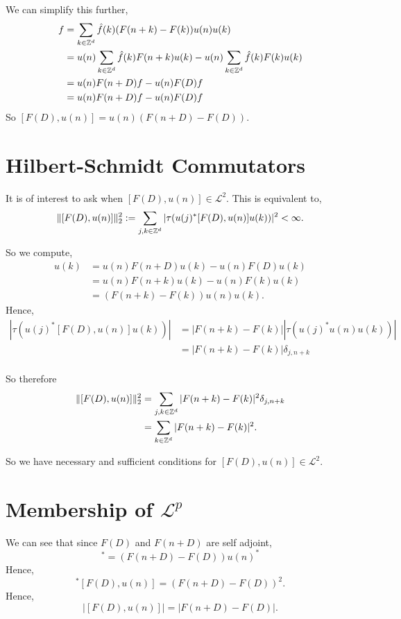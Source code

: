 We can simplify this further,
\begin{align}
    [F(D),u(n)]f &= \sum_{k \in \Itgr^d} \hat{f}(k) (F(n+k)-F(k))u(n)u(k)\\
                 &= u(n)\sum_{k \in \Itgr^d}  \hat{f}(k) F(n+k)u(k) - u(n) \sum_{k \in \Itgr^d} \hat{f}(k)F(k)u(k)\\
                 &= u(n) F(n+D)f - u(n)F(D)f\\
                 \label{commutatorFormula}
                 &= u(n)F(n+D)f - u(n)F(D)f
\end{align}
So $[F(D),u(n)] = u(n)(F(n+D)-F(D))$. 

\section{Hilbert-Schmidt Commutators}
It is of interest to ask when $[F(D),u(n)] \in \mathcal{L}^2$. This is equivalent to,
\begin{equation}
    \|[F(D),u(n)]\|_{2}^2 := \sum_{j,k \in \mathbb{Z}^d} |\tau(u(j)^* [F(D),u(n)]u(k))|^2 < \infty.
\end{equation}

So we compute,
\begin{align}
    [F(D),u(n)]u(k) &= u(n)F(n+D)u(k) - u(n)F(D)u(k)\\
                    &= u(n)F(n+k)u(k) - u(n)F(k)u(k)\\
                    &= (F(n+k)-F(k))u(n)u(k).
\end{align}
Hence,
\begin{align}
    |\tau(u(j)^*[F(D),u(n)]u(k))| &= |F(n+k)-F(k)||\tau(u(j)^*u(n)u(k))|\\
                                  &= |F(n+k)-F(k)|\delta_{j,n+k}\\
\end{align}

So therefore
\begin{align}
\label{HSConditions}
    \|[F(D),u(n)]\|_{2}^2 &= \sum_{j,k \in \Itgr^d} |F(n+k)-F(k)|^2 \delta_{j,n+k}\\
                          &= \sum_{k \in \Itgr^d} |F(n+k)-F(k)|^2.
\end{align}

So we have necessary and sufficient conditions for $[F(D),u(n)] \in \mathcal{L}^2$. 

\section{Membership of $\mathcal{L}^p$}
We can see that since $F(D)$ and $F(n+D)$ are self adjoint, 
\begin{equation}
    [F(D),u(n)]^* = (F(n+D)-F(D))u(n)^*
\end{equation}
Hence,
\begin{equation}
    [F(D),u(n)]^*[F(D),u(n)] = (F(n+D)-F(D))^2.
\end{equation}
Hence,
\begin{equation}
    |[F(D),u(n)]| = |F(n+D)-F(D)|.
\end{equation}

